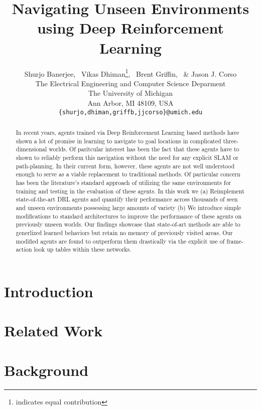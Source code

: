 \documentclass{article} %
\title{Navigating Unseen Environments using Deep Reinforcement Learning}
\author{Shurjo Banerjee\footnotemark[1],%
  \, Vikas Dhiman\thanks{indicates equal contribution},%
  \, Brent Griffin,%
  \, \& Jason J. Corso\\
  The Electrical Engineering and Computer Science Deparment\\
The University of Michigan\\
Ann Arbor, MI 48109, USA \\
\texttt{\{shurjo,dhiman,griffb,jjcorso\}@umich.edu} \\
}
\begin{document}
\maketitle

\begin{abstract}
In recent years, agents trained via Deep Reinforcement Learning based methods have shown a lot of promise in learning to navigate to goal locations in complicated three-dimensional worlds. Of paritcular interest has been the fact that these agents have to shown to reliably perform this navigation  without the need for any explicit SLAM or path-planning. In their current form, however, these agents are not well understood enough to serve as a viable replacement to traditional methods. Of particular concern has been the literature's standard approach of utilizing the same environments for training and testing in the evaluation of these agents. In this work we (a) Reimplement state-of-the-art DRL agents and quantify their performance across thousands of seen and unseen environments possessing large amounts of variety (b) We introduce simple modifications to standard architectures to improve the performance of these agents on previously unseen worlds. Our findings showcase that state-of-art methods are able to generlized learned behaviors but retain no memory of previously visited areas. Our modified agents are found to outperform them drastically via the explicit use of frame-action look up tables within these networks. 
\end{abstract}

\section{Introduction}
%



\section{Related Work}


\section{Background}


%
\end{document}
